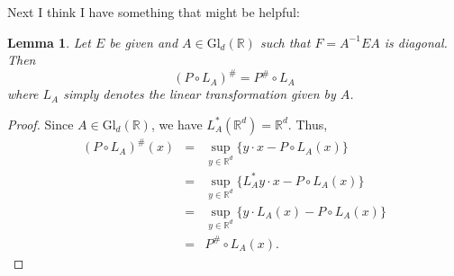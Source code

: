 \documentclass[11pt]{article}
\newtheorem{lemma}[theorem]{Lemma}
\newcommand\GldR{\mbox{Gl}_d(\mathbb{R})}%
\newcommand\R{\mathbb{R}}
\begin{document}
Next I think I have something that might be helpful:
\begin{lemma}
Let $E$ be given and $A\in \GldR{}$ such that $F = A^{-1}EA$ is diagonal. Then
\begin{equation*}
    (P\circ L_A)^{\#} = P^\# \circ L_A
\end{equation*}
where $L_A$ simply denotes the linear transformation given by $A$. 
\end{lemma}
\begin{proof}
Since $A\in \GldR{}$, we have $L_A^*(\R^d) = \R^d$. Thus,
\begin{eqnarray*}
    (P\circ L_A)^\#(x) 
    &=& \sup_{y\in \R^d} \{ y\cdot x - P\circ L_A(x) \} \\
    &=& \sup_{y\in \R^d} \{ L_A^* y \cdot x - P \circ L_A(x) \}\\
    &=& \sup_{y\in \R^d} \{ y \cdot L_A(x) - P \circ L_A(x) \}\\
    &=& P^\# \circ L_A(x).
\end{eqnarray*}
\end{proof}
\end{document}
